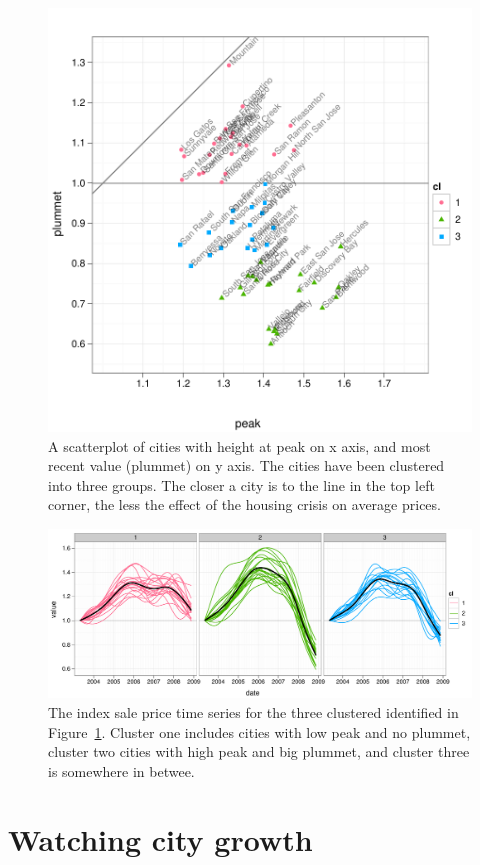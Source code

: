 \documentclass[oneside]{article}
\begin{document}
\begin{figure}[htbp]
  \centering
    \includegraphics[width=0.75 \linewidth]{cities-clustering}
  \caption{A scatterplot of cities with height at peak on x axis, and most recent value (plummet) on y axis.  The cities have been clustered into three groups.  The closer a city is to the line in the top left corner, the less the effect of the housing crisis on average prices.}
  \label{fig:clustering}
\end{figure}

\begin{figure}[htbp]
  \centering
  \includegraphics[width=\linewidth]{cities-indexed-clustered}
  \caption{The index sale price time series for the three clustered identified in Figure~\ref{fig:clustering}.  Cluster one includes cities with low peak and no plummet, cluster two cities with high peak and big plummet, and cluster three is somewhere in betwee.}
  \label{fig:clustered}
\end{figure}

\section{Watching city growth}
\end{document}
